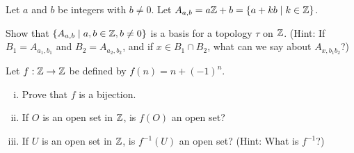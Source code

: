 \item Let $a$ and $b$ be integers with $b \neq 0$. Let $A_{a,b} = a\mathbb{Z}+b = \{a + kb \mid k \in \mathbb{Z}\}$. 
	\ba
	\item Show that $\{A_{a,b} \mid a, b \in \mathbb{Z}, b \neq 0\}$ is a basis for a topology $\tau$ on $\mathbb{Z}$. (Hint: If $B_1 = A_{a_1,b_1}$ and $B_2 = A_{a_2,b_2}$, and if $x \in B_1 \cap B_2$, what can we say about $A_{x,b_1b_2}$?)
	
	\item Let $f : \mathbb{Z} \to \mathbb{Z}$ be defined by $f(n) = n + (-1)^n$. 
	
	\begin{enumerate}[i.]
	
	\item Prove that $f$ is a bijection.
	
	\item If $O$ is an open set in $\mathbb{Z}$, is $f(O)$ an open set?
	
	\item If $U$ is an open set in $\mathbb{Z}$, is $f^{-1}(U)$ an open set? (Hint: What is $f^{-1}$?)
	
	\end{enumerate}
	 
	\ea

